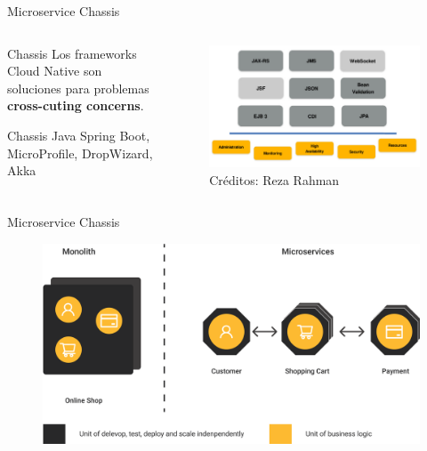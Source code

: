 \documentclass[aspectratio=169]{beamer}
\begin{document}
\begin{frame}{Microservice Chassis}
	
	
	
	\begin{columns}[T] %
		\begin{column}[T]{6cm} %
			\begin{block}{Chassis}
				Los frameworks Cloud Native son soluciones para problemas \textbf{cross-cuting concerns}.
			\end{block}
			\begin{block}{Chassis Java}
				Spring Boot, MicroProfile, DropWizard, Akka
			\end{block}
		\end{column}
		\begin{column}[T]{7cm} %
			\begin{figure}
				\centering
				\includegraphics[width=\linewidth]{Images/javaeemicropancake}
				\caption{Créditos: Reza Rahman}
			\end{figure}
			
		\end{column}
	\end{columns}
	
\end{frame}

\begin{frame}{Microservice Chassis}
	\begin{figure}
		\centering
		\includegraphics[width=0.7\linewidth]{Images/mp0}
	\end{figure}
\end{frame}
\end{document}

